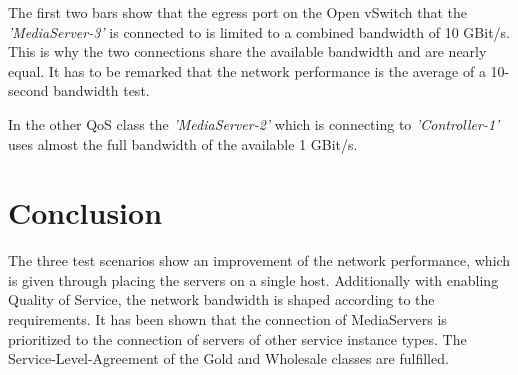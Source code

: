 The first two bars show that the egress port on the Open vSwitch that the \textit{'MediaServer-3'} is connected to is limited to a combined bandwidth of 10 GBit/s. This is why the two connections share the available bandwidth and are nearly equal. It has to be remarked that the network performance is the average of a 10-second bandwidth test.

In the other QoS class the \textit{'MediaServer-2'} which is connecting to \textit{'Controller-1'} uses almost the full bandwidth of the available 1 GBit/s.

\section{Conclusion}

The three test scenarios show an improvement of the network performance, which is given through placing the servers on a single host. Additionally with enabling Quality of Service, the network bandwidth is shaped according to the requirements. It has been shown that the connection of MediaServers is prioritized to the connection of servers of other service instance types. The Service-Level-Agreement of the Gold and Wholesale classes are fulfilled.